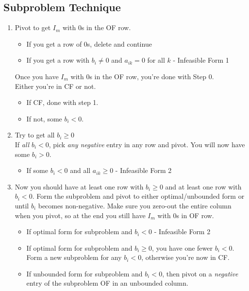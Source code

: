 \documentclass[10pt]{article}
\begin{document}
\begin{multicols*}{2}
\begin{minipage}{\columnwidth}
        \subsection*{Subproblem Technique}
        \begin{enumerate}
            \item Pivot to get \(I_m\) with 0s in the OF row.
                  \begin{itemize}
                      \item If you get a row of 0s, delete and continue
                      \item If you get a row with \(b_i \neq 0\) and \(a_{ik} = 0\) for all \(k\) - Infeasible Form 1
                  \end{itemize}
                  Once you have \(I_m\) with 0s in the OF row, you're done with Step 0.
                  \\
                  Either you're in CF or not.
                  \begin{itemize}
                      \item If CF, done with step 1.
                      \item If not, some \(b_i < 0\).
                  \end{itemize}
            \item Try to get all \(b_i \geq 0\) \\
                  If \textit{all} \(b_i < 0\), pick \textit{any negative} entry in any row and pivot. You will now have some \(b_i > 0\).
                  \begin{itemize}
                      \item If some \(b_i < 0\) and all \(a_{ik} \geq 0\) - Infeasible Form 2
                  \end{itemize}
            \item Now you should have at least one row with \(b_i \geq 0\) and
                  at least one row with \(b_i < 0\). Form the subproblem and pivot
                  to either optimal/unbounded form or until \(b_i\) becomes non-negative.
                  Make sure you zero-out the entire column when you pivot, so at the end you
                  still have \(I_m\) with 0s in OF row.
                  \begin{itemize}
                      \item If optimal form for subproblem and \(b_i < 0\) - Infeasible Form 2
                      \item If optimal form for subproblem and \(b_i \geq 0\), you have one fewer \(b_i < 0\). Form a new subproblem for any \(b_i < 0\), otherwise you're now in CF.
                      \item If unbounded form for subproblem and \(b_i < 0\), then pivot on a \textit{negative} entry of the subproblem OF in an unbounded column.
                  \end{itemize}
        \end{enumerate}

\end{minipage}
\end{multicols*}
\end{document}
